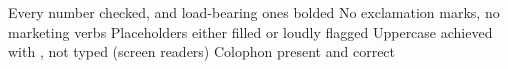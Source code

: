 \documentclass[fontpath=fonts/,logopath=logo/]{riposte-doc}
\begin{document}

\begin{riptodolist}
\riptodo Every number checked, and load-bearing ones bolded
\riptodo No exclamation marks, no marketing verbs
\riptodo Placeholders either filled or loudly flagged
\riptodo Uppercase achieved with , not typed (screen readers)
\riptodo Colophon present
\riptodo {} and  correct
\end{riptodolist}

\ripend
\end{document}
